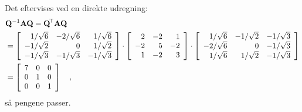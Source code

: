 \begin{example}
Det eftervises ved en direkte udregning:
\begin{equation}
\begin{aligned}
&\mathbf{Q}^{-1} \mathbf{A} \mathbf{Q} = \mathbf{Q}\hspace*{-.6mm}^{\top} \mathbf{A} \mathbf{Q}\\  &= \left[
                                                            \begin{array}{rrr}
                                                              1/\sqrt{6} &   -2/\sqrt{6}  & 1/\sqrt{6} \\
                                                              -1/\sqrt{2} & 0 & 1/\sqrt{2} \\
                                                              -1/\sqrt{3}& -1/\sqrt{3} & -1/\sqrt{3} \\
                                                            \end{array}
                                                          \right] \cdot \left[
               \begin{array}{rrr}
                 2 & -2 & 1 \\
                 -2 & 5 & -2 \\
                 1 & -2 & 3 \\
               \end{array}
             \right] \cdot \left[
                                                            \begin{array}{rrr}
                                                              1/\sqrt{6} & -1/\sqrt{2} & -1/\sqrt{3} \\
                                                              -2/\sqrt{6} & 0 &-1/\sqrt{3} \\
                                                              1/\sqrt{6} & 1/\sqrt{2} & -1/\sqrt{3} \\
                                                            \end{array}
                                                          \right] \\ &=
                                                          \left[
                                                                      \begin{array}{rrr}
                                                                        7 & 0 & 0 \\
                                                                        0 & 1 & 0 \\
                                                                        0 & 0 & 1 \\
                                                                      \end{array}
                                                                    \right] \quad ,
\end{aligned}
\end{equation}
så pengene passer. \\


\end{example}

